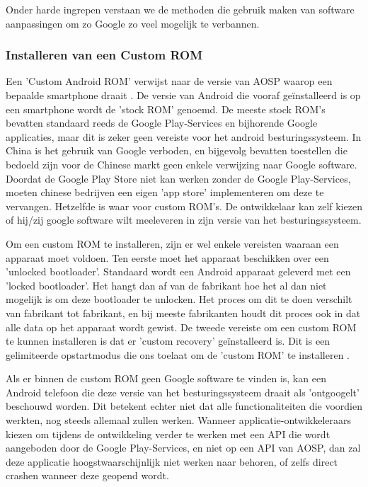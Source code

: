 Onder harde ingrepen verstaan we de methoden die gebruik maken van software aanpassingen om zo Google zo veel mogelijk te verbannen.

\subsubsection{Installeren van een Custom ROM}
Een 'Custom Android ROM' verwijst naar de versie van AOSP waarop een bepaalde smartphone draait \autocite{custom-rom}. De versie van Android die vooraf geïnstalleerd is op een smartphone wordt de 'stock ROM' genoemd. De meeste stock ROM's bevatten standaard reeds de Google Play-Services en bijhorende Google applicaties, maar dit is zeker geen vereiste voor het android besturingssysteem. In China is het gebruik van Google verboden, en bijgevolg bevatten toestellen die bedoeld zijn voor de Chinese markt geen enkele verwijzing naar Google software. Doordat de Google Play Store niet kan werken zonder de Google Play-Services, moeten chinese bedrijven een eigen 'app store' implementeren om deze te vervangen. Hetzelfde is waar voor custom ROM's. De ontwikkelaar kan zelf kiezen of hij/zij google software wilt meeleveren in zijn versie van het besturingssysteem.

Om een custom ROM te installeren, zijn er wel enkele vereisten waaraan een apparaat moet voldoen. Ten eerste moet het apparaat beschikken over een 'unlocked bootloader'. Standaard wordt een Android apparaat geleverd met een 'locked bootloader'. Het hangt dan af van de fabrikant hoe het al dan niet mogelijk is om deze bootloader te unlocken. Het proces om dit te doen verschilt van fabrikant tot fabrikant, en bij meeste fabrikanten houdt dit proces ook in dat alle data op het apparaat wordt gewist. De tweede vereiste om een custom ROM te kunnen installeren is dat er 'custom recovery' geïnstalleerd is. Dit is een gelimiteerde opstartmodus die ons toelaat om de 'custom ROM' te installeren \autocite{hoffman_custom-recovery}.

Als er binnen de custom ROM geen Google software te vinden is, kan een Android telefoon die deze versie van het besturingssysteem draait als 'ontgoogelt' beschouwd worden. Dit betekent echter niet dat alle functionaliteiten die voordien werkten, nog steeds allemaal zullen werken. Wanneer applicatie-ontwikkeleraars kiezen om tijdens de ontwikkeling verder te werken met een API die wordt aangeboden door de Google Play-Services, en niet op een API van AOSP, dan zal deze applicatie hoogstwaarschijnlijk niet werken naar behoren, of zelfs direct crashen wanneer deze geopend wordt.

